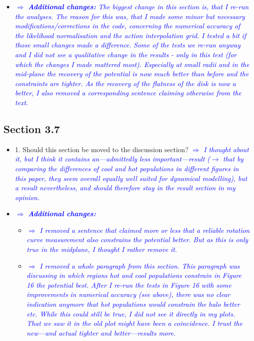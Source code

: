 \documentclass[10pt,a4paper]{article}
\newcommand{\Comment}[1]{\textsl{\textcolor{Blue}{$\Longrightarrow$ {#1}}}}
\begin{document}
\begin{itemize}
\item \Comment{\textbf{Additional changes:} The biggest change in this section is, that I re-run the analyses. The reason for this was, that I made some minor but necessary modifications/corrections in the code, concerning the numerical accuracy of the likelihood normalisation and the action interpolation grid. I tested a bit if those small changes made a difference. Some of the tests we re-run anyway and I did not see a qualitative change in the results - only in this test (for which the changes I made mattered most). Especially at small radii and in the mid-plane the recovery of the potential is now much better than before and the constraints are tighter. As the recovery of the flatness of the disk is now a better, I also removed a corresponding sentence claiming otherwise from the text.}
\end{itemize}

\subsection{Section 3.7}
\begin{itemize}
\item 1. Should this section be moved to the discussion section?
\Comment{I thought about it, but I think it contains an---admittedly less important---result ($\longrightarrow$ that by comparing the differences of cool and hot populations in different figures in this paper, they seem overall equally well suited for dynamical modelling), but a result nevertheless, and should therefore stay in the result section in my opinion.}
\item \Comment{\textbf{Additional changes:}} 
\begin{itemize}
\item \Comment{I removed a sentence that claimed more or less that a reliable rotation curve measurement also constrains the potential better. But as this is only true in the midplane, I thought I rather remove it.}
\item \Comment{I removed a whole paragraph from this section. This paragraph was discussing in which regions hot and cool populations constrain in Figure 16 the potential best. After I re-run the tests in Figure 16 with some improvements in numerical accuracy (see above), there was no clear indication anymore that hot populations would constrain the halo better etc. While this could still be true, I did not see it directly in my plots. That we saw it in the old plot might have been a coincidence. I trust the new---and actual tighter and better---results more.}
\end{itemize}
\end{itemize}
\end{document}
